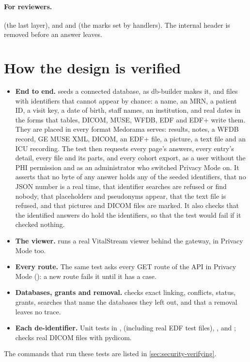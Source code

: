 \paragraph{For reviewers.}   (the last layer), and 
and  (the marks set by handlers). The internal header
 is removed before an answer leaves.

\section{How the design is verified}
\label{sec:protecting-verified}

\begin{itemize}
\item \textbf{End to end.}  seeds a connected database, as
  db-builder makes it, and files with identifiers that cannot appear by chance: a name, an MRN, a
  patient ID, a visit key, a date of
  birth, staff names, an institution, and real dates in the forms that tables, DICOM, MUSE, WFDB,
  EDF and EDF+ write them. They are placed in every format Medorama serves: results, notes, a
  WFDB record, GE MUSE XML, DICOM, an EDF+ file, a picture, a text file and an ICU recording. The
  test then requests every page's answers, every entry's detail, every file and its parts, and
  every cohort export, as a user without the PHI permission and as an administrator
  who switched Privacy Mode on. It asserts that no byte of any answer holds any of the seeded
  identifiers, that no JSON number is a real time, that identifier searches are refused or find
  nobody, that placeholders and pseudonyms appear, that the text file is refused, and that
  pictures and DICOM files are marked. It also checks that the identified answers do hold the
  identifiers, so that the test would fail if it checked nothing.
\item \textbf{The viewer.}  runs a real VitalStream viewer behind
  the gateway, in Privacy Mode too.
\item \textbf{Every route.} The same test asks every GET route of the API in Privacy Mode
  (): a new route fails it until it has a case.
\item \textbf{Databases, grants and removal.}  checks exact
  linking, conflicts, status, grants, searches that name the databases they left out, and that a
  removal leaves no trace.
\item \textbf{Each de-identifier.} Unit tests in ,  (including real
  EDF test files), ,  and ;
   checks real DICOM files with pydicom.
\end{itemize}
The commands that run these tests are listed in \cref{sec:security-verifying}.

